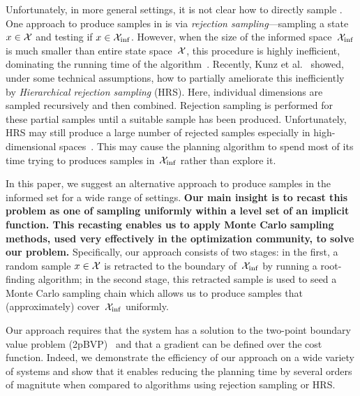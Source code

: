 \documentclass[letterpaper, 10 pt, conference]{ieeeconf}  %
\begin{document}
Unfortunately, in more general settings,
it is not clear how to directly sample \Cinf.
%
One approach to produce samples in \Cinf is via \emph{rejection sampling}---sampling a state $x \in \mathcal{X}$ and testing if $x \in \mathcal{X}_{\rm {inf}}$.
However, when the size of the informed space~$\mathcal{X}_{\rm {inf}}$ is much smaller than entire state space~$\mathcal{X}$, this procedure is highly inefficient, dominating the running time of the algorithm~\cite{KTC16}.
Recently, Kunz et al.~\cite{KTC16} showed, under some technical assumptions, how to partially ameliorate this inefficiently by \emph{Hierarchical rejection sampling} (HRS). 
Here, individual dimensions are sampled recursively 
and then combined. Rejection sampling is performed for these partial samples until a suitable sample has been produced. 
Unfortunately, HRS may still produce a large number of rejected samples especially in high-dimensional spaces~\cite{KTC16}.
This may cause the planning algorithm to spend most of its time trying to produces samples in~$\mathcal{X}_{\rm {inf}}$ rather than explore it.

In this paper, we suggest an alternative approach to produce samples in the informed set \Cinf for a wide range of settings.
\textbf{
Our main insight is to recast this problem as one of sampling uniformly within a level set of an implicit function.
This recasting enables us to apply Monte Carlo sampling methods, used very effectively in the optimization community, to solve our problem.
}
%
Specifically, our approach consists of two stages:
in the first, a random sample $x \in \mathcal{X}$ is retracted to the boundary of~$\mathcal{X}_{\rm {inf}}$ by running a root-finding algorithm;
in the second stage, this retracted sample  is used to seed a Monte Carlo sampling chain which allows us to  produce samples that (approximately) cover~$\mathcal{X}_{\rm {inf}}$  uniformly.

Our approach requires that the system has a solution to the two-point boundary value problem (2pBVP)~\cite{L06, H02} and that a gradient can be defined over the cost function.
Indeed, we demonstrate the efficiency of our approach on a wide variety of systems and show that it enables reducing the planning time by several orders of magnitute when compared to algorithms using rejection sampling or HRS.
\end{document}
